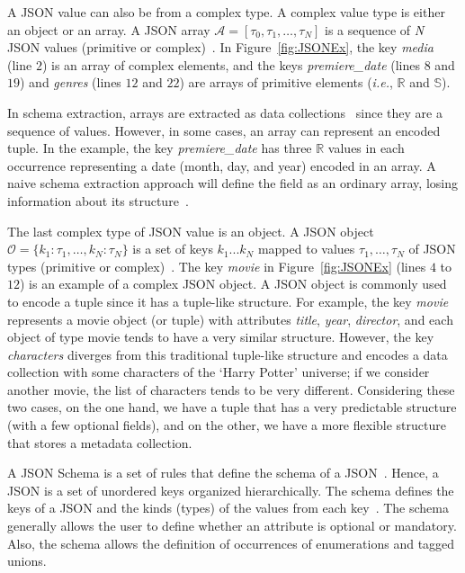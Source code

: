 A JSON value can also be from a complex type. A complex value type is either an object or an array. A JSON array $\mathcal{A}=[\tau_0, \tau_1,\ldots,\tau_N]$ is a sequence of \textit{N} JSON values (primitive or complex)~\citep{Sp+21}. In Figure~\ref{fig:JSONEx}, the key \textit{media} (line $2$) is an array of complex elements, and the keys \textit{premiere\_date} (lines $8$ and $19$) and \textit{genres} (lines $12$ and $22$) are arrays of primitive elements (\textit{i.e.}, $\mathbb{R}$ and $\mathbb{S}$).

In schema extraction, arrays are extracted as data collections~\citep{Sp+21} since they are a sequence of values. However, in some cases, an array can represent an encoded tuple. 
In the example, the key  \textit{premiere\_date} has three $\mathbb{R}$ values in each occurrence representing a date (month, day, and year) encoded in an array. A naive schema extraction approach will define the field as an ordinary array, losing information about its structure~\citep{Sp+21}.


The last complex type of JSON value is an object. A JSON object $\mathcal{O} = \{ k_1:\tau_1,\ldots,k_N:\tau_N\}$ is a set of keys $k_1...k_N$ mapped to values $\tau_1,\ldots,\tau_N$ of JSON types (primitive or complex)~\citep{Sp+21}. The key \textit{movie} in Figure~\ref{fig:JSONEx} (lines $4$ to $12$) is an example of a complex JSON object. A JSON object is commonly used to encode a tuple since it has a tuple-like structure. 
For example, the key \textit{movie} represents a movie object (or tuple) with attributes \textit{title}, \textit{year}, \textit{director}, and each object of type movie tends to have a very similar structure. However, the key \textit{characters} diverges from this traditional tuple-like structure and encodes a data collection with some characters of the `Harry Potter' universe; if we consider another movie, the list of characters tends to be very different. Considering these two cases, on the one hand, we have a tuple that has a very predictable structure (with a few optional fields), and on the other, we have a more flexible structure that stores a metadata collection.

A JSON Schema is a set of rules that define the schema of a JSON~\citep{Pezoa16}. Hence, a JSON is a set of unordered keys organized hierarchically. The schema defines the keys of a JSON and the kinds (types) of the values from each key~\citep{Sp+21}. The schema generally allows the user to define whether an attribute is optional or mandatory. Also, the schema allows the definition of occurrences of enumerations and tagged unions. 

